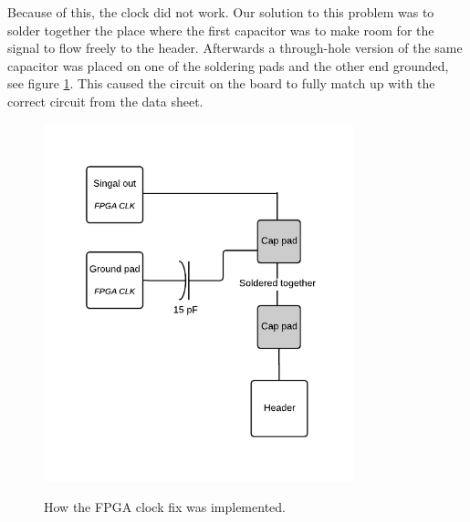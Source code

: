 \documentclass[../main/report.tex]{subfiles}
\begin{document}
Because of this, the clock did not work.
Our solution to this problem was to solder together the place where the first capacitor was to make room for the signal to flow freely to the header.
Afterwards a through-hole version of the same capacitor was placed on one of the soldering pads and the other end grounded, see figure \ref{fig:pcb-clock-fix}.
This caused the circuit on the board to fully match up with the correct circuit from the data sheet.

\begin{figure}[H]
    \centering
    \includegraphics[width=0.8\textwidth]{../pcb/assets/pcb-clock-fix.pdf}
    \label{fig:pcb-clock-fix}
    \caption{How the FPGA clock fix was implemented.}
\end{figure}
\end{document}
